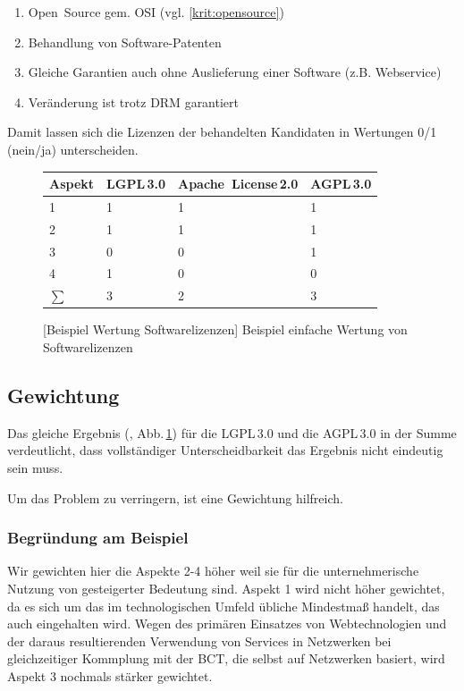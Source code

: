 \begin{enumerate} 		\setlength\itemsep{0em}\setlength\parskip{0em}\setlength\topsep{0em}\setlength\partopsep{0em}\setlength\parsep{0em}
\item Open~Source gem. OSI (vgl. \ref{krit:opensource})
\item Behandlung von Software-Patenten
\item Gleiche Garantien auch ohne Auslieferung einer Software (z.B. Webservice)
\item Veränderung ist trotz \gls{DRM} garantiert
\end{enumerate}

Damit lassen sich die Lizenzen der behandelten Kandidaten in Wertungen 0/1 (nein/ja) unterscheiden.

\begin{figure}[!htp]
\centering
\begin{tabular}{l|lll}
Aspekt	& LGPL\,3.0 	& Apache~License\,2.0 & AGPL\,3.0 \\
\hline
\hline
1 		& 1	& 1	& 1	\\
\hline
2 		& 1	& 1	& 1	\\
\hline
3 		& 0	& 0	& 1	\\
\hline
4		& 1 & 0 & 0 \\
\hline
\hline
\(\sum\)& 3 & 2 & 3 \\
\end{tabular}
[Beispiel Wertung Softwarelizenzen]{\label{abb:wertung:oss} Beispiel einfache Wertung von Softwarelizenzen}
\end{figure}

\subsection{Gewichtung}

Das gleiche Ergebnis (, Abb.\,\ref{abb:wertung:oss}) für die LGPL\,3.0 und die AGPL\,3.0 in der Summe verdeutlicht,
dass vollständiger Unterscheidbarkeit das Ergebnis nicht eindeutig sein muss.

Um das Problem zu verringern, ist eine Gewichtung hilfreich.

\subsubsection*{Begründung am Beispiel}
Wir gewichten hier die Aspekte 2-4 höher weil sie für die unternehmerische Nutzung von gesteigerter Bedeutung sind.
Aspekt 1 wird nicht höher gewichtet, da es sich um das im technologischen Umfeld übliche Mindestmaß handelt, das auch eingehalten wird.
Wegen des primären Einsatzes von Webtechnologien und der daraus resultierenden Verwendung von Services in Netzwerken bei gleichzeitiger Kommplung mit der \gls{BCT}, die selbst auf Netzwerken basiert, wird Aspekt 3 nochmals stärker gewichtet.

